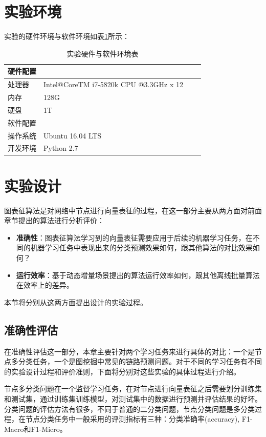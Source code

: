 \section{实验环境}
实验的硬件环境与软件环境如表\ref{my-label5_1}所示：

\begin{table}[]
	\centering
	\caption{实验硬件与软件环境表}
	\label{my-label5_1}
	\begin{tabular}{@{}llll@{}}
		\toprule
		硬件配置\\ \midrule
		处理器&	Intel@CoreTM i7-5820k CPU @3.3GHz x 12\\ \midrule
		内存&	128G\\ \midrule
		硬盘&	1T\\ \midrule
		软件配置 \\ \midrule
		操作系统&	Ubuntu 16.04 LTS \\ \midrule
		开发环境&	Python 2.7  \\ \bottomrule
	\end{tabular}
\end{table}

\section{实验设计}
图表征算法是对网络中节点进行向量表征的过程，在这一部分主要从两方面对前面章节提出的算法进行分析评价：
\begin{itemize}
	\item \textbf{准确性}：图表征算法学习到的向量表征需要应用于后续的机器学习任务，在不同的机器学习任务中表现出来的分类预测效果如何，跟其他算法的对比效果如何？
	\item \textbf{运行效率}：基于动态增量场景提出的算法运行效率如何，跟其他离线批量算法在效率上的差异。
\end{itemize}
本节将分别从这两方面提出设计的实验过程。
\subsection{准确性评估}
在准确性评估这一部分，本章主要针对两个学习任务来进行具体的对比：一个是节点多分类任务，一个是图挖掘中常见的链路预测问题。对于不同的学习任务有不同的实验设计过程和评价准则，下面将分别对这些实验的具体过程进行介绍。

节点多分类问题在一个监督学习任务，在对节点进行向量表征之后需要划分训练集和测试集，通过训练集训练模型，对测试集中的数据进行预测并评估结果的好坏。分类问题的评估方法有很多，不同于普通的二分类问题，节点分类问题是多分类过程，在节点分类任务中一般采用的评测指标有三种：分类准确率(accuracy), F1-Macro和F1-Micro。

